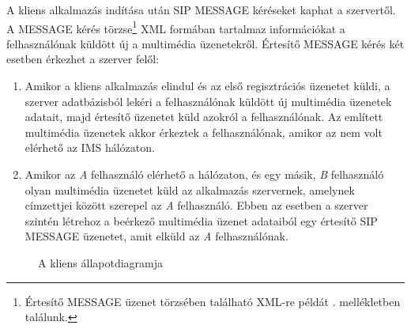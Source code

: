 A kliens alkalmazás indítása után SIP MESSAGE kéréseket kaphat a szervertől. A MESSAGE kérés törzse\footnote{Értesítő MESSAGE üzenet törzsében található XML-re példát . mellékletben találunk.} XML formában tartalmaz információkat a felhasználónak küldött új a multimédia üzenetekről. Értesítő MESSAGE kérés két esetben érkezhet a szerver felől:

\begin{enumerate}\itemsep1pt
\item	Amikor a kliens alkalmazás elindul és az első regisztrációs üzenetet küldi, a szerver adatbázisból lekéri a felhasználónak küldött új multimédia üzenetek adatait, majd értesítő üzenetet küld azokról a felhasználónak. Az említett multimédia üzenetek akkor érkeztek a felhasználónak, amikor az nem volt elérhető az IMS hálózaton.
\item Amikor az \emph{A} felhasználó  elérhető a hálózaton, és egy másik, \emph{B} felhasználó olyan multimédia üzenetet küld az alkalmazás szervernek, amelynek címzettjei között szerepel az \emph{A} felhasználó. Ebben az esetben a szerver szintén létrehoz a beérkező multimédia üzenet adataiból egy értesítő SIP MESSAGE üzenetet, amit elküld az \emph{A} felhasználónak.
\end{enumerate} 

\begin{figure}[htb]
\center
{}
\caption{A kliens állapotdiagramja}
\label{fig:client_statemachine_full}
\end{figure}

